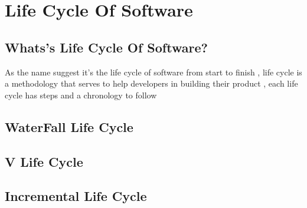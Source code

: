 \section{Life Cycle Of Software}
\subsection{Whats's Life Cycle Of Software?}
As the name suggest it's the life cycle of software from start to finish , life cycle is a methodology
that serves to help developers in building their product , each life cycle has steps and a chronology to follow
\subsection{WaterFall Life Cycle}
\subsection{V Life Cycle}
\subsection{Incremental Life Cycle}
